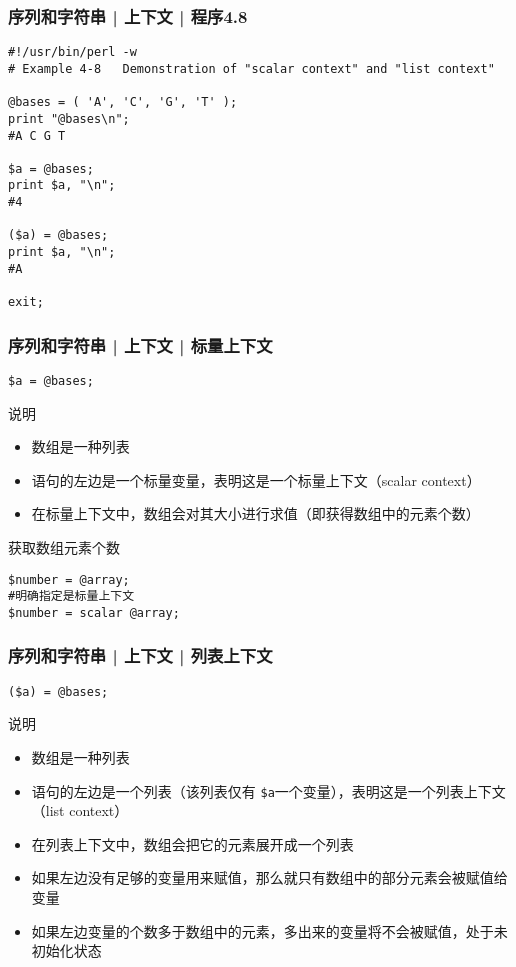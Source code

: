 \begin{frame}[fragile]
  \frametitle{序列和字符串 | 上下文 | \alert{程序4.8}}
\begin{lstlisting}[basicstyle=\small\tt]
#!/usr/bin/perl -w
# Example 4-8   Demonstration of "scalar context" and "list context"

@bases = ( 'A', 'C', 'G', 'T' );
print "@bases\n";
#A C G T

$a = @bases;
print $a, "\n";
#4

($a) = @bases;
print $a, "\n";
#A

exit;
\end{lstlisting}
\end{frame}

\begin{frame}[fragile]
  \frametitle{序列和字符串 | 上下文 | \alert{标量上下文}}
\begin{lstlisting}
$a = @bases;
\end{lstlisting}
\pause
\begin{block}{说明}
  \begin{itemize}
    \item 数组是一种列表
    \item 语句的左边是一个标量变量，表明这是一个标量上下文（scalar context）
    \item 在标量上下文中，数组会对其大小进行求值（即获得数组中的元素个数）
  \end{itemize}
\end{block}
\pause
\begin{block}{获取数组元素个数}
\begin{lstlisting}
$number = @array;
#明确指定是标量上下文
$number = scalar @array;
\end{lstlisting}
\end{block}
\end{frame}

\begin{frame}[fragile]
  \frametitle{序列和字符串 | 上下文 | \alert{列表上下文}}
\begin{lstlisting}
($a) = @bases;
\end{lstlisting}
\pause
\begin{block}{说明}
  \begin{itemize}
    \item 数组是一种列表
    \item 语句的左边是一个列表（该列表仅有 \verb|$a|一个变量），表明这是一个列表上下文（list context）
    \item 在列表上下文中，数组会把它的元素展开成一个列表
    \item 如果左边没有足够的变量用来赋值，那么就只有数组中的部分元素会被赋值给变量
    \item 如果左边变量的个数多于数组中的元素，多出来的变量将不会被赋值，处于未初始化状态
  \end{itemize}
\end{block}
\end{frame}

